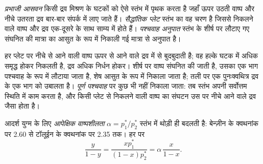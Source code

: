 \begin{definition}[प्रभाजी आसवन]\label{def:b2:liquid-vapour-diagrams:fractional-distillation}
\emph{प्रभाजी आसवन} किसी द्रव मिश्रण के घटकों को ऐसे
स्तंभ में पृथक करता है जहाँ ऊपर उठती वाष्प और नीचे उतरता द्रव
बार-बार संपर्क में लाए जाते हैं। \emph{सैद्धांतिक
प्लेट} स्तंभ का वह चरण है जिससे निकलने वाले वाष्प
और द्रव एक-दूसरे के साथ साम्य में होते हैं। \emph{पश्चवाह
अनुपात} स्तंभ के शीर्ष पर लौटाए गए संघनित की मात्रा का
आसुत के रूप में निकाली गई मात्रा से अनुपात है।
\end{definition}

हर प्लेट पर नीचे से आने वाली वाष्प ऊपर से आने वाले द्रव में से बुदबुदाती है; वह
हल्के घटक में अधिक समृद्ध होकर निकलती है, द्रव अधिक निर्धन होकर। शीर्ष पर वाष्प
संघनित की जाती है, उसका एक भाग पश्चवाह के रूप में लौटाया जाता है, शेष
आसुत के रूप में निकाला जाता है; तली पर एक पुनःक्वथित्र द्रव के एक भाग को उबालता है।
\textit{पूर्ण पश्चवाह} पर कुछ भी नहीं निकाला जाता: तब स्तंभ अपनी सर्वोत्तम स्थिति में काम करता है,
और किसी प्लेट से निकलने वाली वाष्प का संघटन उस पर नीचे आने वाले द्रव
जैसा होता है।


आदर्श युग्म के लिए \textit{आपेक्षिक वाष्पशीलता} $\alpha = p_1^*/p_2^*$
स्तंभ में थोड़ी ही बदलती है: बेन्ज़ीन के क्वथनांक पर 2.60 से
टॉलूईन के क्वथनांक पर 2.35 तक। हर  पर
\[
  \frac{y}{1 - y} = \frac{xp_1^*}{(1 - x)p_2^*} = \alpha\,\frac{x}{1 - x} .
\]


